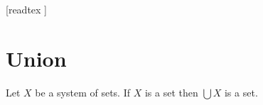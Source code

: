 \documentclass[10pt]{article}
\begin{document}
  \begin{imports}
    \begin{forthel}
      [readtex ]
    \end{forthel}
  \end{imports}


  \section{Union}

  \begin{forthel}
    \begin{axiom}[title=Union Axiom,id=FOUNDATIONS_10_5536459412996096,printid]
      Let $X$ be a system of sets.
      If $X$ is a set then $\bigcup X$ is a set.
    \end{axiom}
  \end{forthel}
\end{document}
